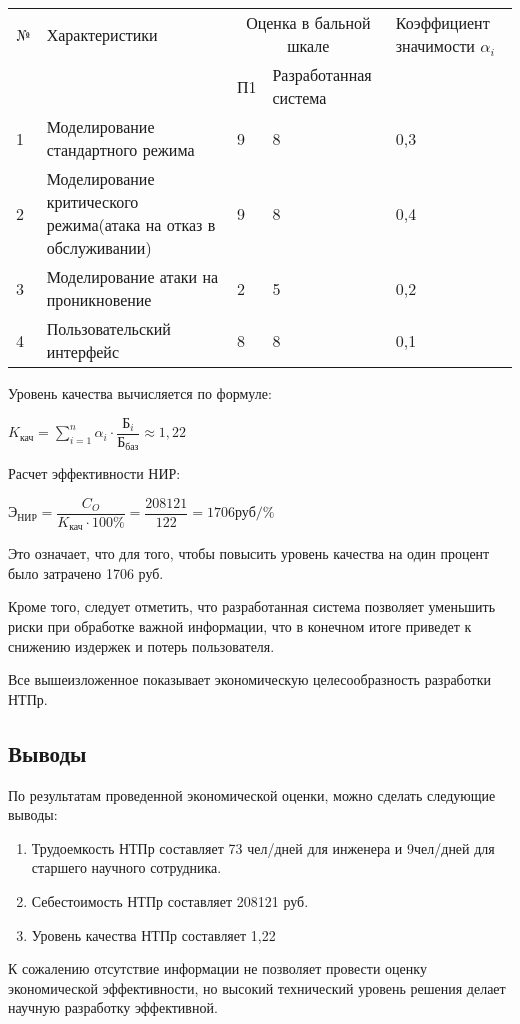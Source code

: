 \begin{tabular}{|p{1em}|p{17em}|p{6em}|p{7em}|p{7em}|}
  \hline
  № & Характеристики & \multicolumn{2}{|c|}{Оценка в бальной шкале} & Коэффициент значимости $\alpha_{i}$ \\
  \ & \ & П1 & Разработанная система & \ \\ \hline
  1 & Моделирование стандартного режима & 9 & 8 & 0,3 \\ \hline
  2 & Моделирование критического режима(атака на отказ в обслуживании) & 9 & 8 & 0,4 \\ \hline
  3 & Моделирование атаки на проникновение & 2 & 5 & 0,2 \\ \hline
  4 & Пользовательский интерфейс & 8 & 8 & 0,1 \\ \hline
\end{tabular}

Уровень качества вычисляется по формуле:

\begin{center}
  $K_{\text{кач}} = \sum_{i=1}^n \alpha_{i} \cdot \dfrac{\text{Б}_{i}}{\text{Б}_{\text{баз}}} \approx 1,22$
\end{center}

Расчет эффективности НИР:

\begin{center}
  $\text{Э}_{\text{НИР}} = \dfrac{C_{O}}{K_{\text{кач}} \cdot 100\%} = \dfrac{208121}{122} = 1706  \text{руб}/\%$
\end{center}

Это означает, что для того, чтобы повысить уровень качества на один процент было затрачено 1706 руб.

Кроме того, следует отметить, что разработанная система позволяет уменьшить риски при обработке важной информации, что в конечном итоге приведет к снижению издержек и потерь пользователя.

Все вышеизложенное показывает экономическую целесообразность разработки НТПр.

\subsection*{Выводы}

По результатам проведенной экономической оценки, можно сделать следующие выводы:

\begin{enumerate}
  \item Трудоемкость НТПр составляет 73 чел/дней для инженера и 9чел/дней для старшего научного сотрудника.
  \item Себестоимость НТПр составляет 208121 руб.
  \item Уровень качества НТПр составляет 1,22
\end{enumerate}

К сожалению отсутствие информации не позволяет провести оценку экономической эффективности, но высокий технический уровень решения делает научную разработку эффективной.

